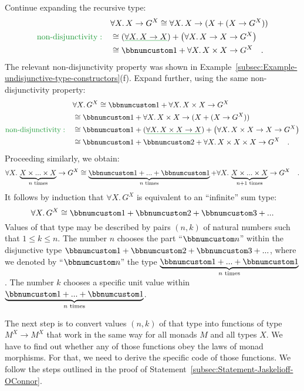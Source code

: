 Continue expanding the recursive type:
\begin{align*}
 & \forall X.\,X\rightarrow G^{X}\cong\forall X.\,X\rightarrow(X+(X\rightarrow G^{X}))\\
{\color{greenunder}\text{non-disjunctivity}:}\quad & \cong(\gunderline{\forall X.\,X\rightarrow X})+\big(\forall X.\,X\rightarrow X\rightarrow G^{X}\big)\\
 & \cong\bbnum 1+\forall X.\,X\times X\rightarrow G^{X}\quad.
\end{align*}
The relevant non-disjunctivity property was shown in Example~\ref{subsec:Example-undisjunctive-type-constructors}(f).
Expand further, using the same non-disjunctivity property:
\begin{align*}
 & \forall X.\,G^{X}\cong\bbnum 1+\forall X.\,X\times X\rightarrow G^{X}\\
 & \cong\bbnum 1+\forall X.\,X\times X\rightarrow(X+(X\rightarrow G^{X}))\\
{\color{greenunder}\text{non-disjunctivity}:}\quad & \cong\bbnum 1+(\gunderline{\forall X.\,X\times X\rightarrow X})+\big(\forall X.\,X\times X\rightarrow X\rightarrow G^{X}\big)\\
 & \cong\bbnum 1+\bbnum 2+\forall X.\,X\times X\times X\rightarrow G^{X}\quad.
\end{align*}
Proceeding similarly, we obtain:
\[
\forall X.\,\underbrace{X\times...\times X}_{n\text{ times}}\rightarrow G^{X}\cong\underbrace{\bbnum 1+...+\bbnum 1}_{n\text{ times}}+\forall X.\,\underbrace{X\times...\times X}_{n+1\text{ times}}\rightarrow G^{X}\quad.
\]
It follows by induction that $\forall X.\,G^{X}$ is equivalent to
an \textsf{``}infinite\textsf{''} sum type:
\[
\forall X.\,G^{X}\cong\bbnum 1+\bbnum 2+\bbnum 3+...
\]
Values of that type may be described by pairs $\left(n,k\right)$
of natural numbers such that $1\le k\le n$. The number $n$ chooses
the part \textsf{``}$\bbnum n$\textsf{''} within the disjunctive type $\bbnum 1+\bbnum 2+\bbnum 3+...$,
where we denoted by \textsf{``}$\bbnum n$\textsf{''} the type $\underbrace{\bbnum 1+...+\bbnum 1}_{n\text{ times}}$.
The number $k$ chooses a specific unit value within $\underbrace{\bbnum 1+...+\bbnum 1}_{n\text{ times}}$.

The next step is to convert values $\left(n,k\right)$ of that type
into functions of type $M^{X}\rightarrow M^{X}$ that work in the
same way for all monads $M$ and all types $X$. We have to find out
whether any of those functions obey the laws of monad morphisms. For
that, we need to derive the specific code of those functions. We follow
the steps outlined in the proof of Statement~\ref{subsec:Statement-Jaskelioff-OConnor}.

